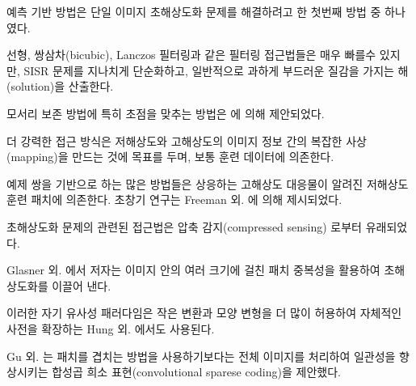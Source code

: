 \documentclass[10pt,twocolumn,letterpaper]{article}
\newcommand{\kor}[1]{#1}
\newcommand{\eng}[1]{}
\newcommand{\summary}[1]{}
\begin{document}
\eng{
Prediction-based methods were among the first methods to tackle \ac{SISR}.
}\kor{
예측 기반 방법은 \ac{단일 이미지 초해상도화} 문제를 해결하려고 한 첫번째 방법 중 하나였다.
} \eng{
While these filtering approaches, \eg linear, bicubic or Lanczos \cite{Duchon1979} filtering, can be very fast, they oversimplify the \ac{SISR} problem and usually yield solutions with overly smooth textures.
}\kor{
\eg 선형, 쌍삼차(bicubic), Lanczos \cite{Duchon1979} 필터링과 같은 필터링 접근법들은 매우 빠를수 있지만, \ac{SISR} 문제를 지나치게 단순화하고, 일반적으로 과하게 부드러운 질감을 가지는 해(solution)을 산출한다.
}
\eng{
Methods that put particularly focus on edge-preservation have been proposed \cite{Allebach96, Li2001}.
}\kor{
모서리 보존 방법에 특히 초점을 맞추는 방법은 \cite{Allebach96, Li2001}에 의해 제안되었다.
}

\summary{
예측 기반 방법과 필터링 접근법의 한계와 모서리 보존 방법
}

\eng{
More powerful approaches aim to establish a complex mapping between low- and high-resolution image information and usually rely on training data.
}\kor{
더 강력한 접근 방식은 저해상도와 고해상도의 이미지 정보 간의 복잡한 사상(mapping)을 만드는 것에 목표를 두며, 보통 훈련 데이터에 의존한다.
}\eng{
Many methods that are based on example-pairs rely on \ac{LR} training patches for which the corresponding \ac{HR} counterparts are known. Early work was presented by Freeman et al. \cite{Freeman2000,Freeman2002}.
}\kor{
예제 쌍을 기반으로 하는 많은 방법들은 상응하는 \ac{고해상도} 대응물이 알려진 \ac{저해상도} 훈련 패치에 의존한다. 초창기 연구는 Freeman 외. \cite{Freeman2000,Freeman2002}에 의해 제시되었다.
}\eng{
Related approaches to the \ac{SR} problem originate in compressed sensing \cite{Yang08, Dong2011, zeyde2012single}.
}\kor{
\ac{초해상도화} 문제의 관련된 접근법은 압축 감지(compressed sensing) \cite{Yang08, Dong2011, zeyde2012single}로부터 유래되었다.
}
    \eng{
    In Glasner et al. \cite{glasner2009super} the authors exploit patch redundancies across scales within the image to drive the \ac{SR}.
    }\kor{
    Glasner 외. \cite{glasner2009super}에서 저자는 이미지 안의 여러 크기에 걸친 패치 중복성을 활용하여 \ac{초해상도화}를 이끌어 낸다.
    } \eng{
    This paradigm of self-similarity is also employed in Huang et al. \cite{Huang15selfexemplars}, where self dictionaries are extended by further allowing for small transformations and shape variations.
    }\kor{
    이러한 자기 유사성 패러다임은 작은 변환과 모양 변형을 더 많이 허용하여 자체적인 사전을 확장하는 Hung 외. \cite{Huang15selfexemplars}에서도 사용된다.
    }
\eng{
Gu et al. \cite{gu2015convolutional} proposed a convolutional sparse coding approach that improves consistency by processing the whole image rather than overlapping patches.
}\kor{
Gu 외. \cite{gu2015convolutional}는 패치를 겹치는 방법을 사용하기보다는 전체 이미지를 처리하여 일관성을 향상시키는 합성곱 희소 표현(convolutional sparese coding)을 제안했다.
}
\end{document}
